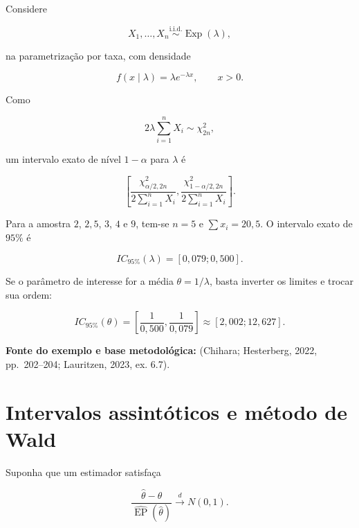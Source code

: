 \documentclass[
  letterpaper,
  DIV=11,
  numbers=noendperiod]{scrreprt}
\begin{document}
Considere

\[X_1,\ldots,X_n\overset{\mathrm{i.i.d.}}{\sim}\operatorname{Exp}(\lambda),\]

na parametrização por taxa, com densidade

\[f(x\mid\lambda)=\lambda e^{-\lambda x},\qquad x>0.\]

Como

\[2\lambda\sum_{i=1}^nX_i\sim\chi^2_{2n},\]

um intervalo exato de nível \(1-\alpha\) para \(\lambda\) é

\[\boxed{
\left[
\frac{\chi^2_{\alpha/2,2n}}{2\sum_{i=1}^nX_i},
\frac{\chi^2_{1-\alpha/2,2n}}{2\sum_{i=1}^nX_i}
\right]
}.\]

\begin{tcolorbox}[enhanced jigsaw, colback=white, leftrule=.75mm, colbacktitle=quarto-callout-note-color!10!white, breakable, titlerule=0mm, bottomtitle=1mm, title=\textcolor{quarto-callout-note-color}{\faInfo}\hspace{0.5em}{Exemplo adaptado --- taxa exponencial}, colframe=quarto-callout-note-color-frame, toprule=.15mm, opacityback=0, bottomrule=.15mm, opacitybacktitle=0.6, arc=.35mm, toptitle=1mm, rightrule=.15mm, coltitle=black, left=2mm]

Para a amostra \(2\), \(2{,}5\), \(3\), \(4\) e \(9\), tem-se \(n=5\) e
\(\sum x_i=20{,}5\). O intervalo exato de \(95\%\) é

\[IC_{95\%}(\lambda)=[0{,}079;0{,}500].\]

Se o parâmetro de interesse for a média \(\theta=1/\lambda\), basta
inverter os limites e trocar sua ordem:

\[IC_{95\%}(\theta)=\left[\frac{1}{0{,}500},\frac{1}{0{,}079}\right]
\approx[2{,}002;12{,}627].\]

\textbf{Fonte do exemplo e base metodológica:} (Chihara; Hesterberg,
2022, pp.~202--204; Lauritzen, 2023, ex. 6.7).

\end{tcolorbox}

\section{Intervalos assintóticos e método de
Wald}\label{intervalos-assintuxf3ticos-e-muxe9todo-de-wald}

Suponha que um estimador satisfaça

\[\frac{\widehat\theta-\theta}{\widehat{\operatorname{EP}}(\widehat\theta)}
\overset{d}{\longrightarrow}N(0,1).\]
\end{document}
